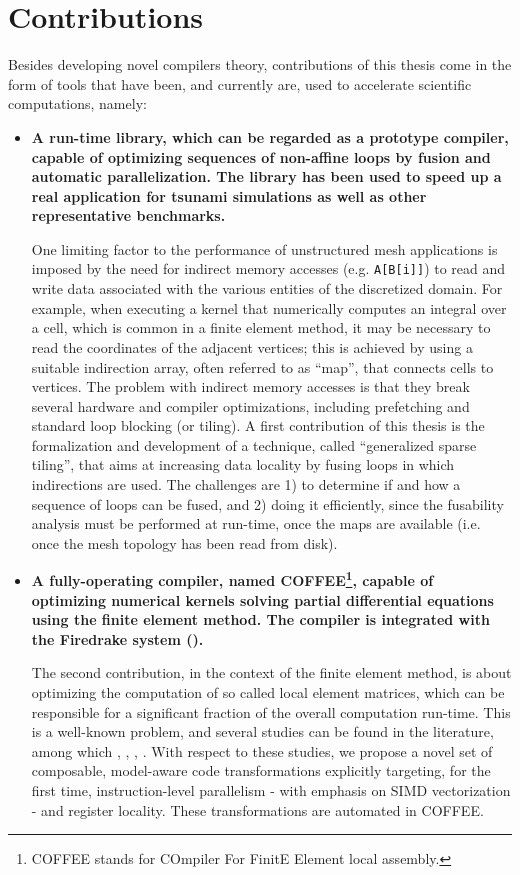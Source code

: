 \section{Contributions}
Besides developing novel compilers theory, contributions of this thesis come in the form of tools that have been, and currently are, used to accelerate scientific computations, namely:
\begin{itemize}
\item \textbf{A run-time library, which can be regarded as a prototype compiler, capable of optimizing sequences of non-affine loops by fusion and automatic parallelization. The library has been used to speed up a real application for tsunami simulations as well as other representative benchmarks.}

One limiting factor to the performance of unstructured mesh applications is imposed by
the need for indirect memory accesses (e.g. \texttt{A[B[i]]}) to read and
write data associated with the various entities of the discretized domain.
For example, when executing a kernel that numerically computes an integral over a cell, 
which is common in a finite element method, it may be necessary
to read the coordinates of the adjacent vertices; this is achieved by
using a suitable indirection array, often referred to as ``map'', that
connects cells to vertices. The problem with indirect 
memory accesses is that they break several hardware and compiler optimizations,
including prefetching and standard loop blocking (or tiling). A first contribution of this thesis
is the formalization and development of a technique, called ``generalized sparse tiling'',
that aims at increasing data locality by fusing loops in which indirections
are used. The challenges are 1) to determine if and how a sequence of loops can be fused,
and 2) doing it efficiently, since the fusability analysis must be performed at
run-time, once the maps are available (i.e. once the mesh topology has been read 
from disk).

\item \textbf{A fully-operating compiler, named COFFEE\footnote{COFFEE stands for COmpiler For FinitE Element local assembly.}, capable of optimizing numerical kernels solving partial differential equations using the finite element method. The compiler is integrated with the Firedrake system (\cite{firedrake-code}).}

The second contribution, in the context of the finite element method, is about 
optimizing the computation of so called local element matrices, which can 
be responsible for a significant fraction of the overall computation run-time.
This is a well-known problem, and several studies can be found in the literature,
among which \citep{francis}, \citep{quadrature-olegaard}, \citep{petsc-integration-gpu}, 
\citep{tensor-kirby}. With respect to these studies, we propose a novel 
set of composable, model-aware code transformations explicitly targeting, for the first time,
instruction-level parallelism - with emphasis on SIMD vectorization - and register locality. 
These transformations are automated in COFFEE.
\end{itemize}


